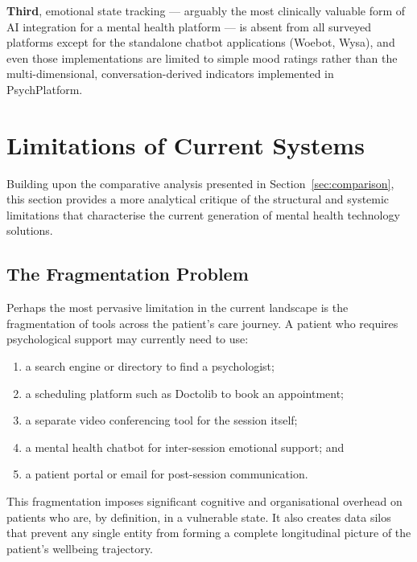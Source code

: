 \textbf{Third}, emotional state tracking — arguably the most clinically valuable
form of AI integration for a mental health platform — is absent from all surveyed
platforms except for the standalone chatbot applications (Woebot, Wysa), and even
those implementations are limited to simple mood ratings rather than the
multi-dimensional, conversation-derived indicators implemented in PsychPlatform.

\section{Limitations of Current Systems}
\label{sec:limitations}

Building upon the comparative analysis presented in Section~\ref{sec:comparison},
this section provides a more analytical critique of the structural and systemic
limitations that characterise the current generation of mental health technology
solutions.

\subsection{The Fragmentation Problem}

Perhaps the most pervasive limitation in the current landscape is the
fragmentation of tools across the patient's care journey. A patient who requires
psychological support may currently need to use:
\begin{enumerate}[label=(\arabic*), itemsep=2pt]
  \item a search engine or directory to find a psychologist;
  \item a scheduling platform such as Doctolib to book an appointment;
  \item a separate video conferencing tool for the session itself;
  \item a mental health chatbot for inter-session emotional support; and
  \item a patient portal or email for post-session communication.
\end{enumerate}
This fragmentation imposes significant cognitive and organisational overhead on
patients who are, by definition, in a vulnerable state. It also creates data
silos that prevent any single entity from forming a complete longitudinal picture
of the patient's wellbeing trajectory.

